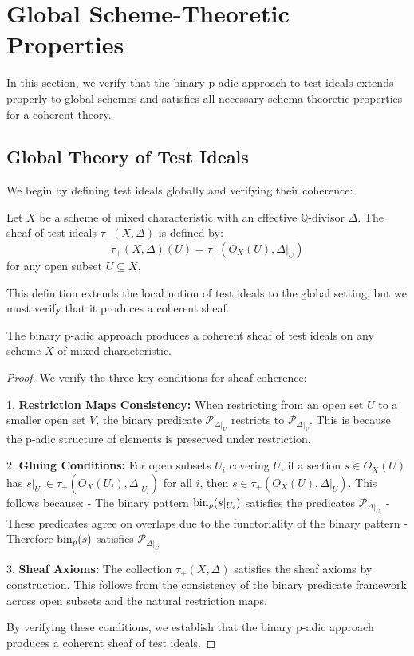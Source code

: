 \section{Global Scheme-Theoretic Properties}\label{sec:global-properties}

In this section, we verify that the binary p-adic approach to test ideals extends properly to global schemes and satisfies all necessary schema-theoretic properties for a coherent theory.

\subsection{Global Theory of Test Ideals}

We begin by defining test ideals globally and verifying their coherence:

\begin{definition}\label{def:global-test-ideal}
Let $X$ be a scheme of mixed characteristic with an effective $\mathbb{Q}$-divisor $\Delta$. The sheaf of test ideals $\tau_+(X,\Delta)$ is defined by:
$$\tau_+(X,\Delta)(U) = \tau_+(O_X(U),\Delta|_U)$$
for any open subset $U \subseteq X$.
\end{definition}

This definition extends the local notion of test ideals to the global setting, but we must verify that it produces a coherent sheaf.

\begin{theorem}\label{thm:global-coherence}
The binary p-adic approach produces a coherent sheaf of test ideals on any scheme $X$ of mixed characteristic.
\end{theorem}

\begin{proof}
We verify the three key conditions for sheaf coherence:

1. \textbf{Restriction Maps Consistency:} When restricting from an open set $U$ to a smaller open set $V$, the binary predicate $\mathcal{P}_{\Delta|_U}$ restricts to $\mathcal{P}_{\Delta|_V}$. This is because the p-adic structure of elements is preserved under restriction.

2. \textbf{Gluing Conditions:} For open subsets $U_i$ covering $U$, if a section $s \in O_X(U)$ has $s|_{U_i} \in \tau_+(O_X(U_i),\Delta|_{U_i})$ for all $i$, then $s \in \tau_+(O_X(U),\Delta|_U)$. This follows because:
   - The binary pattern $\operatorname{bin}_p(s|_{U_i})$ satisfies the predicates $\mathcal{P}_{\Delta|_{U_i}}$
   - These predicates agree on overlaps due to the functoriality of the binary pattern
   - Therefore $\operatorname{bin}_p(s)$ satisfies $\mathcal{P}_{\Delta|_U}$

3. \textbf{Sheaf Axioms:} The collection $\tau_+(X,\Delta)$ satisfies the sheaf axioms by construction. This follows from the consistency of the binary predicate framework across open subsets and the natural restriction maps.

By verifying these conditions, we establish that the binary p-adic approach produces a coherent sheaf of test ideals.
\end{proof}

